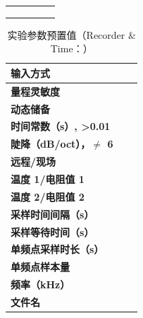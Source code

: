 \begin{table}[h!]
\begin{tabular}{|c|c|c|c|c|}
		\hline
		\hspace{2.5cm} & \hspace{2.5cm} & \hspace{2.5cm} & \hspace{4cm} & \hspace{4cm} \\
		\hline
		\hspace{2.5cm} & \hspace{2.5cm} & \hspace{2.5cm} & \hspace{4cm} & \hspace{4cm} \\
		\hline
		\hspace{2.5cm} & \hspace{2.5cm} & \hspace{2.5cm} & \hspace{4cm} & \hspace{4cm} \\
		\hline
		\hspace{2.5cm} & \hspace{2.5cm} & \hspace{2.5cm} & \hspace{4cm} & \hspace{4cm} \\
		\hline
	\end{tabular}
\end{table}

\begin{table}[h!]
	\centering
	\caption{实验参数预置值（Recorder \& Time：\hspace{4cm}）}
	\label{tab:data1}
	\begin{tabular}{|p{4cm}|p{4cm}|p{4cm}|}
		\hline
		\textbf{输入方式} &  & \\ \hline
		\textbf{量程灵敏度} &  & \\ \hline
		\textbf{动态储备} &  & \\ \hline
		\textbf{时间常数（s）, >0.01} & & \\ \hline
		\textbf{陡降（dB/oct），$\neq$ 6} & & \\ \hline
		\textbf{远程/现场} & & \\ \hline
		\textbf{温度 1/电阻值 1} & & \\ \hline
		\textbf{温度 2/电阻值 2} & & \\ \hline
		\textbf{采样时间间隔（s）} & & \\ \hline
		\textbf{采样等待时间（s）} & & \\ \hline
		\textbf{单频点采样时长（s）} & & \\ \hline
		\textbf{单频点样本量} &  & \\ \hline
		\textbf{频率（kHz）} & & \\ \hline
		\textbf{文件名} & & \\ \hline
	\end{tabular}
\end{table}

